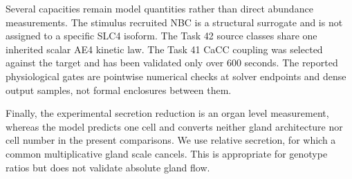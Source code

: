 Several capacities remain model quantities rather than direct abundance measurements. The stimulus recruited NBC is a structural surrogate and is not assigned to a specific SLC4 isoform. The Task 42 source classes share one inherited scalar AE4 kinetic law. The Task 41 CaCC coupling was selected against the target and has been validated only over 600 seconds. The reported physiological gates are pointwise numerical checks at solver endpoints and dense output samples, not formal enclosures between them.

Finally, the experimental secretion reduction is an organ level measurement, whereas the model predicts one cell and converts neither gland architecture nor cell number in the present comparisons. We use relative secretion, for which a common multiplicative gland scale cancels. This is appropriate for genotype ratios but does not validate absolute gland flow.
